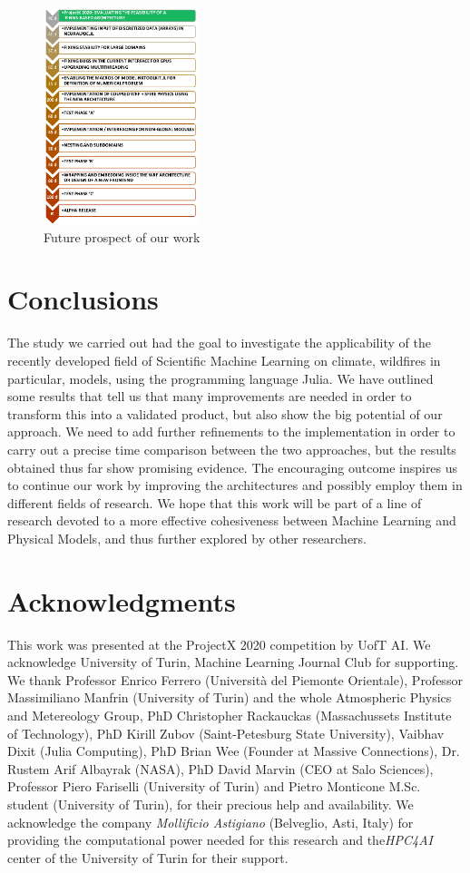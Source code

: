 \documentclass{juliacon}
\begin{document}
\begin{figure}[t]
\centering
\includegraphics[width=0.4\textwidth]{images/future_work.pdf}
\caption{Future prospect of our work}
\label{fig:future_work}
\end{figure}

\section{Conclusions}
The study we carried out had the goal to investigate the applicability of the recently developed field of Scientific Machine Learning on climate, wildfires in particular, models, using the programming language Julia. We have outlined some results that tell us that many improvements are needed in order to transform this into a validated product, but also show the big potential of our approach. We need to add further refinements to the implementation in order to carry out a precise time comparison between the two approaches, but the results obtained thus far show promising evidence.
The encouraging outcome inspires us to continue our work by improving the architectures and possibly employ them in different fields of research.
We hope that this work will be part of a line of research devoted to a more effective cohesiveness between Machine Learning and Physical Models, and thus further explored by other researchers.

\section{Acknowledgments}
This work was presented at the ProjectX 2020 competition by UofT AI.
We acknowledge University of Turin, Machine Learning Journal Club for supporting.
We thank Professor Enrico Ferrero (Università del Piemonte Orientale), Professor Massimiliano Manfrin (University of Turin) and the whole Atmospheric Physics and Metereology Group, PhD Christopher Rackauckas (Massachussets Institute of Technology), PhD Kirill Zubov (Saint-Petesburg State University), Vaibhav Dixit (Julia Computing), PhD Brian Wee (Founder at Massive Connections), Dr. Rustem Arif Albayrak (NASA), PhD David Marvin (CEO at Salo Sciences), Professor Piero Fariselli (University of Turin) and Pietro Monticone M.Sc. student (University of Turin), for their precious help and availability.
We acknowledge the company \textit{Mollificio Astigiano} (Belveglio, Asti, Italy) for providing the computational power needed for this research and the\textit{HPC4AI} center of the University of Turin for their support.
\end{document}

